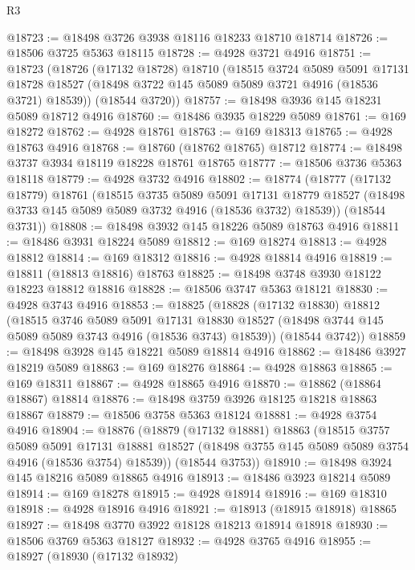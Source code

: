 \begin{lexlean}{R3}
\begin{coremodule}
@18723 := @18498 @3726 @3938 @18116 @18233 @18710 @18714
@18726 := @18506 @3725 @5363 @18115
@18728 := @4928 @3721 @4916
@18751 := @18723
    (@18726
      (@17132 @18728)
      @18710
      (@18515
        @3724
        @5089
        @5091
        @17131
        @18728
        @18527
        (@18498 @3722 @145 @5089 @5089 @3721 @4916 (@18536 @3721) @18539))
      (@18544 @3720))
@18757 := @18498 @3936 @145 @18231 @5089 @18712 @4916
@18760 := @18486 @3935 @18229 @5089
@18761 := @169 @18272
@18762 := @4928 @18761
@18763 := @169 @18313
@18765 := @4928 @18763 @4916
@18768 := @18760 (@18762 @18765) @18712
@18774 := @18498 @3737 @3934 @18119 @18228 @18761 @18765
@18777 := @18506 @3736 @5363 @18118
@18779 := @4928 @3732 @4916
@18802 := @18774
    (@18777
      (@17132 @18779)
      @18761
      (@18515
        @3735
        @5089
        @5091
        @17131
        @18779
        @18527
        (@18498 @3733 @145 @5089 @5089 @3732 @4916 (@18536 @3732) @18539))
      (@18544 @3731))
@18808 := @18498 @3932 @145 @18226 @5089 @18763 @4916
@18811 := @18486 @3931 @18224 @5089
@18812 := @169 @18274
@18813 := @4928 @18812
@18814 := @169 @18312
@18816 := @4928 @18814 @4916
@18819 := @18811 (@18813 @18816) @18763
@18825 := @18498 @3748 @3930 @18122 @18223 @18812 @18816
@18828 := @18506 @3747 @5363 @18121
@18830 := @4928 @3743 @4916
@18853 := @18825
    (@18828
      (@17132 @18830)
      @18812
      (@18515
        @3746
        @5089
        @5091
        @17131
        @18830
        @18527
        (@18498 @3744 @145 @5089 @5089 @3743 @4916 (@18536 @3743) @18539))
      (@18544 @3742))
@18859 := @18498 @3928 @145 @18221 @5089 @18814 @4916
@18862 := @18486 @3927 @18219 @5089
@18863 := @169 @18276
@18864 := @4928 @18863
@18865 := @169 @18311
@18867 := @4928 @18865 @4916
@18870 := @18862 (@18864 @18867) @18814
@18876 := @18498 @3759 @3926 @18125 @18218 @18863 @18867
@18879 := @18506 @3758 @5363 @18124
@18881 := @4928 @3754 @4916
@18904 := @18876
    (@18879
      (@17132 @18881)
      @18863
      (@18515
        @3757
        @5089
        @5091
        @17131
        @18881
        @18527
        (@18498 @3755 @145 @5089 @5089 @3754 @4916 (@18536 @3754) @18539))
      (@18544 @3753))
@18910 := @18498 @3924 @145 @18216 @5089 @18865 @4916
@18913 := @18486 @3923 @18214 @5089
@18914 := @169 @18278
@18915 := @4928 @18914
@18916 := @169 @18310
@18918 := @4928 @18916 @4916
@18921 := @18913 (@18915 @18918) @18865
@18927 := @18498 @3770 @3922 @18128 @18213 @18914 @18918
@18930 := @18506 @3769 @5363 @18127
@18932 := @4928 @3765 @4916
@18955 := @18927
    (@18930
      (@17132 @18932)

\end{coremodule}
\end{lexlean}

